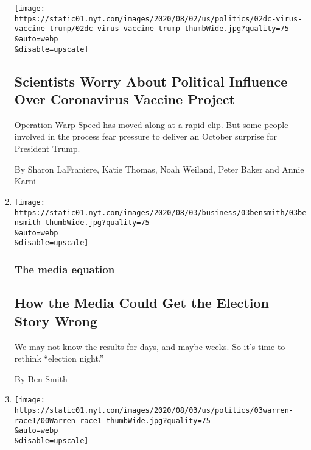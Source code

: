 \begin{enumerate}
  \texttt{[image: https://static01.nyt.com/images/2020/08/02/us/politics/02dc-virus-vaccine-trump/02dc-virus-vaccine-trump-thumbWide.jpg?quality=75\\\&auto=webp\\\&disable=upscale]}

  \hypertarget{scientists-worry-about-political-influence-over-coronavirus-vaccine-project}{%
  \subsection{Scientists Worry About Political Influence Over
  Coronavirus Vaccine
  Project}\label{scientists-worry-about-political-influence-over-coronavirus-vaccine-project}}

  Operation Warp Speed has moved along at a rapid clip. But some people
  involved in the process fear pressure to deliver an October surprise
  for President Trump.

  By Sharon LaFraniere, Katie Thomas, Noah Weiland, Peter Baker and
  Annie Karni
\item
  \href{/2020/08/02/business/media/election-coverage.html}{}

  \texttt{[image: https://static01.nyt.com/images/2020/08/03/business/03bensmith/03bensmith-thumbWide.jpg?quality=75\\\&auto=webp\\\&disable=upscale]}

  \hypertarget{the-media-equation}{%
  \subsubsection{The media equation}\label{the-media-equation}}

  \hypertarget{how-the-media-could-get-the-election-story-wrong}{%
  \subsection{How the Media Could Get the Election Story
  Wrong}\label{how-the-media-could-get-the-election-story-wrong}}

  We may not know the results for days, and maybe weeks. So it's time to
  rethink ``election night.''

  By Ben Smith
\item
  \href{/2020/08/02/us/politics/elizabeth-warren-biden-vice-president.html}{}

  \texttt{[image: https://static01.nyt.com/images/2020/08/03/us/politics/03warren-race1/00Warren-race1-thumbWide.jpg?quality=75\\\&auto=webp\\\&disable=upscale]}

  \hypertarget{elizabeth-warrens-evolution-on-race-brought-her-here}{%
}
\end{enumerate}
